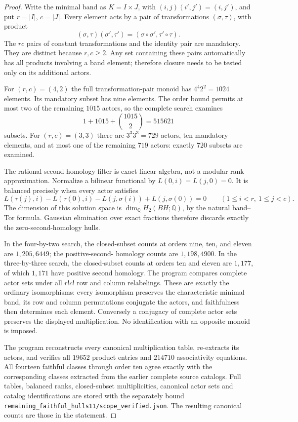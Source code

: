 \begin{proof}
Write the minimal band as $K=I\times J$, with
$(i,j)(i',j')=(i,j')$, and put $r=|I|$, $c=|J|$.
Every element acts by a pair of transformations $(\sigma,\tau)$,
with product
\[
 (\sigma,\tau)(\sigma',\tau')
       =(\sigma\circ\sigma',\tau'\circ\tau).
\]
The $rc$ pairs of constant transformations and the identity
pair are mandatory.  They are distinct because $r,c\geq2$.
Any set containing these pairs automatically has all products
involving a band element; therefore closure needs to be tested
only on its additional actors.

For $(r,c)=(4,2)$ the full transformation-pair monoid has
$4^4 2^2=1024$ elements.  Its mandatory subset has nine
elements.  The order bound permits at most two of the remaining
$1015$ actors, so the complete search examines
\[
 1+1015+\binom{1015}{2}=515621
\]
subsets.  For $(r,c)=(3,3)$ there are $3^3 3^3=729$
actors, ten mandatory elements, and at most one of the
remaining $719$ actors: exactly $720$ subsets are examined.

The rational second-homology filter is exact linear algebra,
not a modular-rank approximation.  Normalize a bilinear
functional by $L(0,i)=L(j,0)=0$.  It is balanced precisely when
every actor satisfies
\[
 L(\tau(j),i)-L(\tau(0),i)
       -L(j,\sigma(i))+L(j,\sigma(0))=0
       \qquad(1\leq i<r,\ 1\leq j<c).
\]
The dimension of this solution space is
$\dim_{\mathbb Q}H_2(BH;\mathbb Q)$, by the natural
band--Tor formula.  Gaussian elimination over exact fractions
therefore discards exactly the zero-second-homology hulls.

In the four-by-two search, the closed-subset counts at orders
nine, ten, and eleven are $1,205,6449$; the positive-second-
homology counts are $1,198,4900$.  In the three-by-three
search, the closed-subset counts at orders ten and eleven
are $1,177$, of which $1,171$ have positive second homology.
The program compares complete actor sets under all
$r!c!$ row and column relabelings.  These are exactly the
ordinary isomorphisms: every isomorphism preserves the
characteristic minimal band, its row and column permutations
conjugate the actors, and faithfulness then determines each
element.  Conversely a conjugacy of complete actor sets
preserves the displayed multiplication.  No identification
with an opposite monoid is imposed.

The program
reconstructs every canonical multiplication table, re-extracts
its actors, and verifies all $19652$ product entries and
$214710$ associativity equations.  All fourteen faithful
classes through order ten agree exactly with the corresponding
classes extracted from the earlier complete source catalogs.
Full tables, balanced ranks, closed-subset multiplicities,
canonical actor sets and catalog identifications are stored
with the separately bound
\texttt{remaining\_faithful\_hulls11/scope\_verified.json}.
The resulting canonical counts are those in the statement.
\end{proof}

